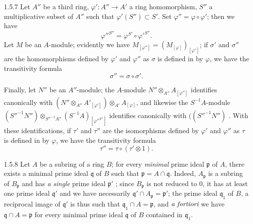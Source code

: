 \begin{env}{1.5.7}
\label{env-0.1.5.7}
Let $A''$ be a third ring, $\varphi'\colon A''\to A'$ a ring homomorphism,
$S''$ a multiplicative subset of $A''$ such that $\varphi'(S'')\subset S'$. Set
$\varphi''=\varphi\circ\varphi'$; then we have
\[
  {\varphi''}^{S''}=\varphi^{S'}\circ{\varphi'}^{S''}.
\]
Let $M$ be an $A$-module; evidently we have $M_{[\varphi'']}=(M_{[\varphi]})_{[\varphi']}$;
if $\sigma'$ and $\sigma''$ are the homomorphisms defined by $\varphi'$ and $\varphi''$ as
$\sigma$ is defined in  by $\varphi$, we have the transitivity formula
\[
  \sigma''=\sigma\circ\sigma'.
\]

Finally, let $N''$ be an $A''$-module; the $A$-module $N''\otimes_{A''}A_{[\varphi'']}$
identifies canonically with
$(N''\otimes_{A''}{A'}_{[\varphi']})\otimes_{A'}A_{[\varphi]}$,
and likewise the $S^{-1}A$-module
${({S''}^{-1}N'')\otimes_{{S''}^{-1}A''}(S^{-1}A)_{[{\varphi''}^{S''}]}}$ identifies
canonically with
$(({S''}^{-1}N'')$ . With these identifications, if $\tau'$
and $\tau''$ are the isomorphisms defined by $\varphi'$ and $\varphi''$ as $\tau$ is defined
in  by $\varphi$, we have the transitivity formula
\[
  \tau''=\tau\circ(\tau'\otimes 1).
\]
\end{env}

\begin{env}{1.5.8}
\label{env-0.1.5.8}
Let $A$ be a subring of a ring $B$; for every \emph{minimal} prime ideal $\mathfrak{p}$ of $A$, there
exists a minimal prime ideal $\mathfrak{q}$ of $B$ such that $\mathfrak{p}=A\cap\mathfrak{q}$. Indeed, $A_\mathfrak{p}$
is a subring of $B_\mathfrak{p}$  and has \emph{a single} prime ideal $\mathfrak{p}'$ ; since
$B_\mathfrak{p}$ is not reduced to $0$, it has at least one prime ideal $\mathfrak{q}'$ and we have
necessarily $\mathfrak{q}'\cap A_\mathfrak{p}=\mathfrak{p}'$; the prime ideal $\mathfrak{q}_1$ of $B$, a reciprocal image
of $\mathfrak{q}'$ is thus such that $\mathfrak{q}_1\cap A=\mathfrak{p}$, and $\emph{a fortiori}$ we have
$\mathfrak{q}\cap A=\mathfrak{p}$ for every minimal prime ideal $\mathfrak{q}$ of $B$ contained in $\mathfrak{q}_1$.
\end{env}

